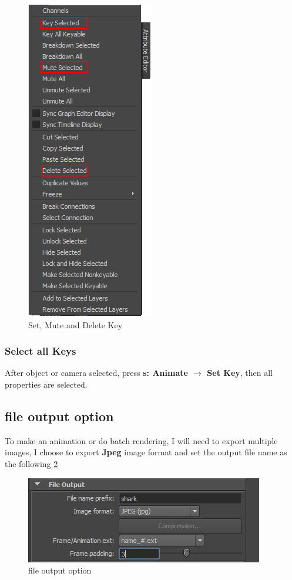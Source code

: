 \documentclass[10pt,a4paper]{article}
\begin{document}
\begin{figure}[h]
\centering
\includegraphics[scale=0.3]{set_mute_del_keyframes}
\caption{Set, Mute and Delete Key}
\label{fig:set_mute_del_keyframes}
\end{figure}

\subsubsection{Select all Keys}
After object or camera selected, press \textbf{s: Animate $ \rightarrow $ Set Key}, then all properties are selected.

\subsection{file output option}
To make an animation or do batch rendering, I will need to export multiple images, I choose to export \textbf{Jpeg} image format and set the output file name as the following \ref{fig:file_output_option}
\begin{figure}[h]
\centering
\includegraphics[scale=0.5]{file_output_option}
\caption{file output option}
\label{fig:file_output_option}
\end{figure}
\end{document}
